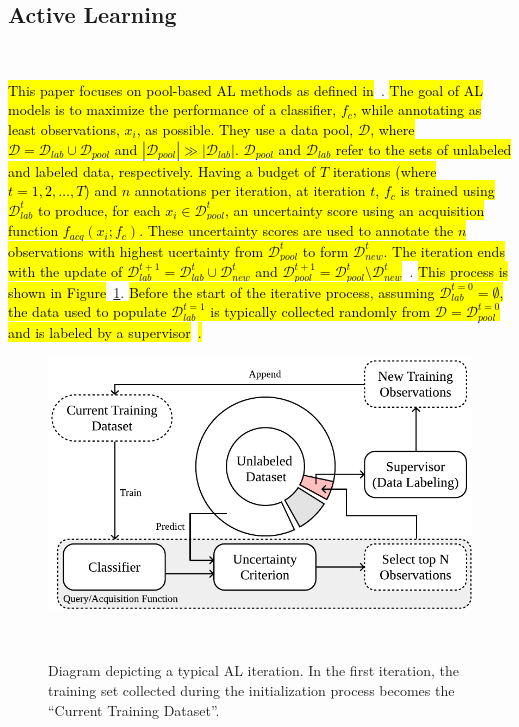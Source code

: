 \documentclass[preprint, 12pt]{elsarticle}
\begin{document}
\subsection{Active Learning}~\label{sec:active_learning_methods}

\hl{This paper focuses on pool-based AL methods as defined
in}~\cite{katz2021improved}. \hl{The goal of AL models is to maximize the
performance of a classifier, $f_{c}$, while annotating as least
observations, $x_i$, as possible. They use a data pool, $\mathcal{D}$, where
$\mathcal{D} = \mathcal{D}_{lab} \cup \mathcal{D}_{pool}$ and
$|\mathcal{D}_{pool}| \gg |\mathcal{D}_{lab}|$. $\mathcal{D}_{pool}$ and
$\mathcal{D}_{lab}$ refer to the sets of unlabeled and labeled data,
respectively. Having a budget of $T$ iterations (where $t = 1, 2, \ldots, T$)
and $n$ annotations per iteration, at iteration $t$, $f_c$ is trained using
$\mathcal{D}_{lab}^t$ to produce, for each $x_i \in \mathcal{D}_{pool}^t$, an
uncertainty score using an acquisition function $f_{acq}(x_i;f_c)$. These
uncertainty scores are used to annotate the $n$
observations with highest ucertainty from $\mathcal{D}_{pool}^t$ to form
$\mathcal{D}_{new}^t$. The iteration ends with the update of
$\mathcal{D}_{lab}^{t+1} = \mathcal{D}_{lab}^t \cup \mathcal{D}_{new}^t$ and
$\mathcal{D}_{pool}^{t+1} = \mathcal{D}_{pool}^t \setminus
\mathcal{D}_{new}^t$}~\cite{Su2020, Sverchkov2017}. \hl{This
process is shown in Figure}~\ref{fig:al_iteration}. \hl{Before the start of
the iterative process, assuming $\mathcal{D}_{lab}^{t=0} = \emptyset$, the
data used to populate $\mathcal{D}_{lab}^{t=1}$ is typically collected
randomly from $\mathcal{D} = \mathcal{D}_{pool}^{t=0}$ and is labeled by a
supervisor}~\cite{Fonseca2021, Yoo2019, Aghdam2019}\hl{.} 

\begin{figure}
	\centering
	\includegraphics[width=.75\linewidth]{../analysis/al_iteration}
    \caption{%
        Diagram depicting a typical AL iteration. In the first iteration, the
        training set collected during the initialization process becomes the
        ``Current Training Dataset''.
    }~\label{fig:al_iteration}
\end{figure}
\end{document}
